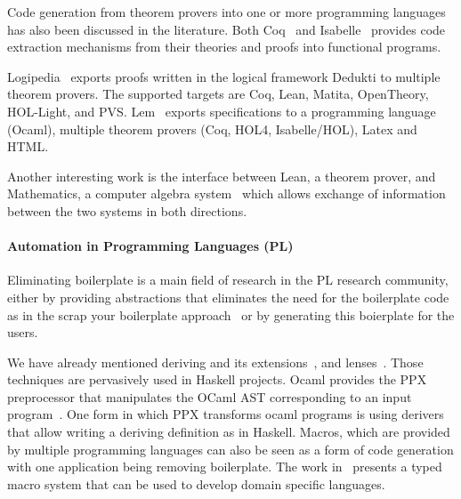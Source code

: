 Code generation from theorem provers into one or more programming languages has also been discussed in the literature. Both Coq~\cite{CoqCodegen2003, cruz2003program} and Isabelle~\cite{IsabelleCodegen2010} provides code extraction mechanisms from their theories and proofs into functional programs. 

Logipedia~\cite{Dowek2019LogipediaAM} exports proofs written in the logical framework Dedukti to multiple theorem provers. The supported targets are Coq, Lean, Matita, OpenTheory, HOL-Light, and PVS. 
Lem~\cite{lem2014} exports specifications to a programming language (Ocaml), multiple theorem provers (Coq, HOL4, Isabelle/HOL), Latex and HTML. 

Another interesting work is the interface between Lean, a theorem prover, and Mathematics, a computer algebra system~\cite{Lewis_2017} which allows exchange of information between the two systems in both directions.  



\paragraph{Automation in Programming Languages (PL)}
Eliminating boilerplate is a main field of research in the PL research community, either by providing abstractions that eliminates the need for the boilerplate code as in the scrap your boilerplate approach~\cite{syb2003Jones} or by generating this boierplate for the users.  

We have already mentioned deriving and its extensions~\cite{loeh2010genericDeriving, loeh2018derivingVia}, and lenses~\cite{lensesLib}. Those techniques are pervasively used in Haskell projects.
Ocaml provides the PPX preprocessor that manipulates the OCaml AST corresponding to an input program~\cite{ocaml2019ppx}. One form in which PPX transforms ocaml programs is using derivers that allow writing a deriving definition as in Haskell. 
Macros, which are provided by multiple programming languages can also be seen as a form of code generation with one application being removing boilerplate. The work in~\cite{macros2001msp} presents a typed macro system that can be used to develop domain specific languages. 


